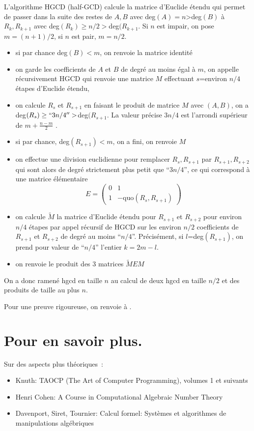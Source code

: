 \documentclass[a4paper,11pt]{book}
\begin{document}
\begin{giacjshere}
L'algorithme HGCD (half-GCD) calcule la matrice d'Euclide \'etendu
qui permet de passer dans la suite des restes
de $A,B$ avec deg$(A)=n$>deg$(B)$ \`a $R_k,R_{k+1}$ 
avec deg$(R_k) \geq n/2 > $deg$(R_{k+1}$. Si $n$ est impair,
on pose $m=(n+1)/2$, si $n$ est pair, $m=n/2$.
\begin{itemize}
\item si par chance deg$(B)<m$, on renvoie la matrice identit\'e
\item on garde 
les coefficients de $A$ et $B$ de degr\'e au moins \'egal \`a $m$, 
on appelle r\'ecursivement HGCD 
qui renvoie une matrice $M$ effectuant 
$s$=environ $n/4$ \'etapes d'Euclide \'etendu,
\item on calcule $R_s$ et $R_{s+1}$ en faisant le produit de matrice
$M$ avec $(A,B)$,
on a deg$(R_s) \geq ``3n/4'' > $deg$(R_{s+1}$. 
La valeur pr\'ecise $3n/4$ est l'arrondi sup\'erieur de $m+\frac{n-m}{2}$ .
\item si par chance, deg$(R_{s+1})<m$, on a fini, on renvoie $M$
\item on effectue une division euclidienne pour remplacer $R_s,R_{s+1}$
par $R_{s+1},R_{s+2}$ qui sont alors de degr\'e strictement plus 
petit que ``$3n/4$'', ce qui correspond \`a une matrice \'el\'ementaire
$$ E=\begin{pmatrix} 0 & 1 \\ 1 & -\mbox{quo}(R_s,R_{s+1}) \end{pmatrix}$$
\item on calcule $\tilde{M}$
la matrice d'Euclide \'etendu pour $R_{s+1}$ et $R_{s+2}$
pour environ $n/4$ \'etapes par appel r\'ecursif de HGCD
sur les environ $n/2$ coefficients de $R_{s+1}$ et $R_{s+2}$ 
de degr\'e au moins ``$n/4$''. Pr\'ecis\'ement,
si $l$=deg$(R_{s+1})$, on prend pour valeur de ``$n/4$'' l'entier
$k=2m-l$.
\item on renvoie le produit des 3 matrices $\tilde{M}EM $
\end{itemize}

On a donc ramen\'e hgcd en taille $n$ au calcul de deux
hgcd en taille $n/2$ et des produits de taille au plus $n$.

Pour une preuve rigoureuse, on renvoie \`a
.

\section{Pour en savoir plus.}
Sur des aspects plus th\'eoriques~:
\begin{itemize}
\item Knuth: TAOCP (The Art of Computer Programming), volumes 1 et suivants
\item Henri Cohen: A Course in Computational Algebraic Number Theory
\item Davenport, Siret, Tournier: Calcul formel: Syst\`emes et algorithmes 
de manipulations  alg\'ebriques
\end{itemize}


\end{giacjshere}
\end{document}

